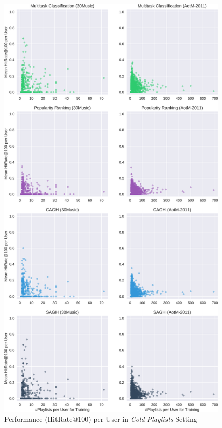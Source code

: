 \begin{figure}[!t]
    \centering
    \includegraphics[height=\textheight]{fig/hitrate_per_user1.png}
    \caption{Performance (HitRate@100) per User in \emph{Cold Playlists} Setting}
\end{figure}

